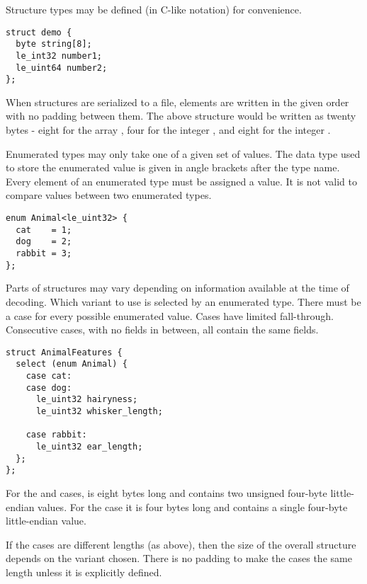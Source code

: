 Structure types may be defined (in C-like notation) for convenience.

\begin{verbatim}
struct demo {
  byte string[8];
  le_int32 number1;
  le_uint64 number2;
};
\end{verbatim}

When structures are serialized to a file, elements are written in the given order with no padding between them.
%
The above structure would be written as twenty bytes - eight for the array , four for the integer , and eight for the integer .

Enumerated types may only take one of a given set of values.
%
The data type used to store the enumerated value is given in angle brackets after the type name.
%
Every element of an enumerated type must be assigned a value.
%
It is not valid to compare values between two enumerated types.

\begin{verbatim}
enum Animal<le_uint32> {
  cat    = 1;
  dog    = 2;
  rabbit = 3;
};
\end{verbatim}

Parts of structures may vary depending on information available at the time of decoding.
%
Which variant to use is selected by an enumerated type.
%
There must be a case for every possible enumerated value.
%
Cases have limited fall-through.
%
Consecutive cases, with no fields in between, all contain the same fields.

\begin{verbatim}
struct AnimalFeatures {
  select (enum Animal) {
    case cat:
    case dog:
      le_uint32 hairyness;
      le_uint32 whisker_length;

    case rabbit:
      le_uint32 ear_length;
  };
};
\end{verbatim}

For the  and  cases,  is eight bytes long and contains two unsigned four-byte little-endian values.
%
For the  case it is four bytes long and contains a single four-byte little-endian value.

If the cases are different lengths (as above), then the size of the overall structure depends on the variant chosen.
%
There is no padding to make the cases the same length unless it is explicitly defined.
